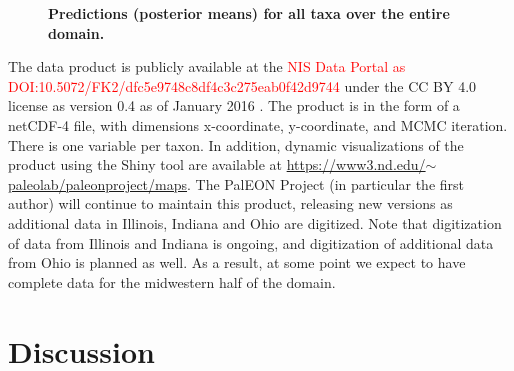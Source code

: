 \documentclass[10pt,letterpaper]{article}
\begin{document}
\begin{figure}

\caption{{\bf Predictions (posterior means) for all taxa over the entire domain.}}
\label{fig:all_predictions}

\end{figure}


The data product is publicly available at the \textcolor{red}{NIS
Data Portal as DOI:10.5072/FK2/dfc5e9748c8df4c3c275eab0f42d9744} under
the CC BY 4.0 license as version 0.4 as of January 2016 \cite{paci:etal:data:2016}.
The product is in the form of a netCDF-4 file, with dimensions x-coordinate,
y-coordinate, and MCMC iteration. There is one variable per taxon.
In addition, dynamic visualizations of the product using the Shiny
tool are available at \href{https://www3.nd.edu/~paleolab/paleonproject/maps}{https://www3.nd.edu/$\sim$paleolab/paleonproject/maps}.
The PalEON Project (in particular the first author) will continue
to maintain this product, releasing new versions as additional data
in Illinois, Indiana and Ohio are digitized. Note that digitization
of data from Illinois and Indiana is ongoing, and digitization of
additional data from Ohio is planned as well. As a result, at some
point we expect to have complete data for the midwestern half of the
domain. 


\section*{Discussion}\label{sec:Discussion}
\end{document}
